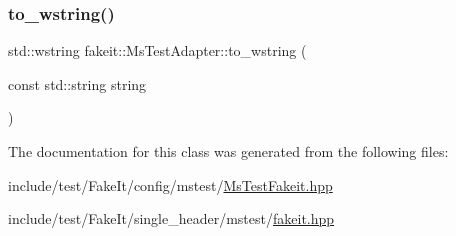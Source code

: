 \subsubsection{\texorpdfstring{to\_wstring()}{to\_wstring()}\hspace{0.1cm}{\footnotesize\ttfamily [2/2]}}
{\footnotesize\ttfamily std\+::wstring fakeit\+::\+Ms\+Test\+Adapter\+::to\+\_\+wstring (\begin{DoxyParamCaption}\item[{const std\+::string}]{string }\end{DoxyParamCaption})\hspace{0.3cm}{\ttfamily [inline]}}



The documentation for this class was generated from the following files\+:\begin{DoxyCompactItemize}
\item 
include/test/\+Fake\+It/config/mstest/\mbox{\hyperlink{MsTestFakeit_8hpp}{Ms\+Test\+Fakeit.\+hpp}}\item 
include/test/\+Fake\+It/single\+\_\+header/mstest/\mbox{\hyperlink{single__header_2mstest_2fakeit_8hpp}{fakeit.\+hpp}}\end{DoxyCompactItemize}
